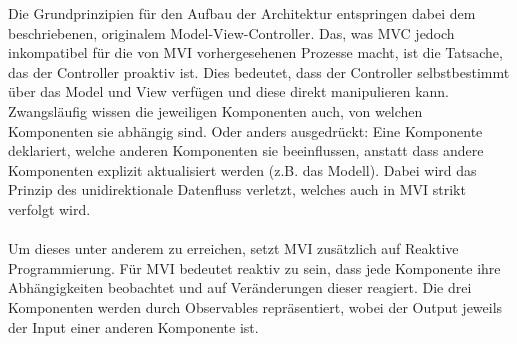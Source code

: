 Die Grundprinzipien für den Aufbau der Architektur entspringen dabei dem beschriebenen, originalem Model-View-Controller. Das, was MVC jedoch inkompatibel für die von MVI vorhergesehenen Prozesse macht, ist die Tatsache, das der Controller proaktiv ist. Dies bedeutet, dass der Controller selbstbestimmt über das Model und View verfügen und diese direkt manipulieren kann. Zwangsläufig wissen die jeweiligen Komponenten auch, von welchen Komponenten sie abhängig sind. Oder anders ausgedrückt: Eine Komponente deklariert, welche anderen Komponenten sie beeinflussen, anstatt dass andere Komponenten explizit aktualisiert werden (z.B. das Modell). Dabei wird das Prinzip des unidirektionale Datenfluss verletzt, welches auch in MVI strikt verfolgt wird. 
\\
\\
Um dieses unter anderem zu erreichen, setzt MVI zusätzlich auf Reaktive Programmierung. Für MVI bedeutet reaktiv zu sein, dass jede Komponente ihre Abhängigkeiten beobachtet und auf Veränderungen dieser reagiert. Die drei Komponenten werden durch Observables repräsentiert, wobei der Output jeweils der Input einer anderen Komponente ist.

